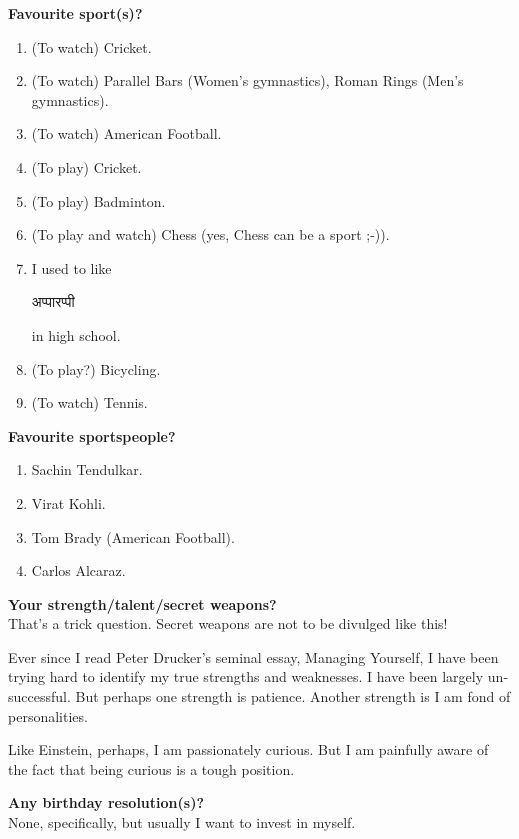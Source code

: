 \documentclass[17pt]{extarticle}  %
\begin{document}
\begin{enumerate}
\begin{english}
\item\textbf{Favourite sport(s)?}\\
\begin{enumerate}
\item (To watch) Cricket.
\item (To watch) Parallel Bars (Women's gymnastics), Roman Rings (Men's gymnastics).
\item (To watch) American Football.
\item (To play) Cricket.
\item (To play) Badminton.
\item (To play and watch) Chess (yes, Chess can be a sport ;-)).
\item I used to like \begin{marathi}अप्पारप्पी\end{marathi} in high school.
\item (To play?) Bicycling.
\item (To watch) Tennis.
\end{enumerate}

\item\textbf{Favourite sportspeople?}\\
\begin{enumerate}
\item Sachin Tendulkar.
\item Virat Kohli.
\item Tom Brady (American Football).
\item Carlos Alcaraz.
\end{enumerate}


\item\textbf{Your strength/talent/secret weapons?}\\

That's a trick question. Secret weapons are not to be divulged like this! 

Ever since I read Peter Drucker's seminal essay, Managing Yourself, I have been trying hard to identify my true strengths and weaknesses. I have been largely unsuccessful. But perhaps one strength is patience. Another strength is I am fond of personalities.

Like Einstein, perhaps, I am passionately curious. But I am painfully aware of the fact that being curious is a tough position.

\item\textbf{Any birthday resolution(s)?}\\

None, specifically, but usually I want to invest in myself.


\end{english}
\end{enumerate}
\end{document}
